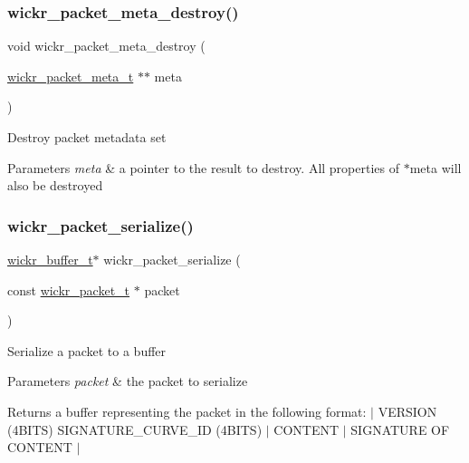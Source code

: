 \subsubsection{\texorpdfstring{wickr\+\_\+packet\+\_\+meta\+\_\+destroy()}{wickr\_packet\_meta\_destroy()}}
{\footnotesize\ttfamily void wickr\+\_\+packet\+\_\+meta\+\_\+destroy (\begin{DoxyParamCaption}\item[{\hyperlink{structwickr__packet__meta}{wickr\+\_\+packet\+\_\+meta\+\_\+t} $\ast$$\ast$}]{meta }\end{DoxyParamCaption})}

Destroy packet metadata set


\begin{DoxyParams}{Parameters}
{\em meta} & a pointer to the result to destroy. All properties of \textquotesingle{}$\ast$meta\textquotesingle{} will also be destroyed \\
\hline
\end{DoxyParams}
\mbox{\label{group__wickr__protocol_gaa983fe863635b69d69d6d86d01443ecf}} 
\subsubsection{\texorpdfstring{wickr\+\_\+packet\+\_\+serialize()}{wickr\_packet\_serialize()}}
{\footnotesize\ttfamily \hyperlink{structwickr__buffer}{wickr\+\_\+buffer\+\_\+t}$\ast$ wickr\+\_\+packet\+\_\+serialize (\begin{DoxyParamCaption}\item[{const \hyperlink{structwickr__packet}{wickr\+\_\+packet\+\_\+t} $\ast$}]{packet }\end{DoxyParamCaption})}

Serialize a packet to a buffer


\begin{DoxyParams}{Parameters}
{\em packet} & the packet to serialize \\
\hline
\end{DoxyParams}
\begin{DoxyReturn}{Returns}
a buffer representing the packet in the following format\+: $\vert$ V\+E\+R\+S\+I\+ON (4\+B\+I\+TS) S\+I\+G\+N\+A\+T\+U\+R\+E\+\_\+\+C\+U\+R\+V\+E\+\_\+\+ID (4\+B\+I\+TS) $\vert$ C\+O\+N\+T\+E\+NT $\vert$ S\+I\+G\+N\+A\+T\+U\+RE OF C\+O\+N\+T\+E\+NT $\vert$ 
\end{DoxyReturn}
\mbox{\label{group__wickr__protocol_ga1671066ddc19b38ed05d4460d5a96706}} 
